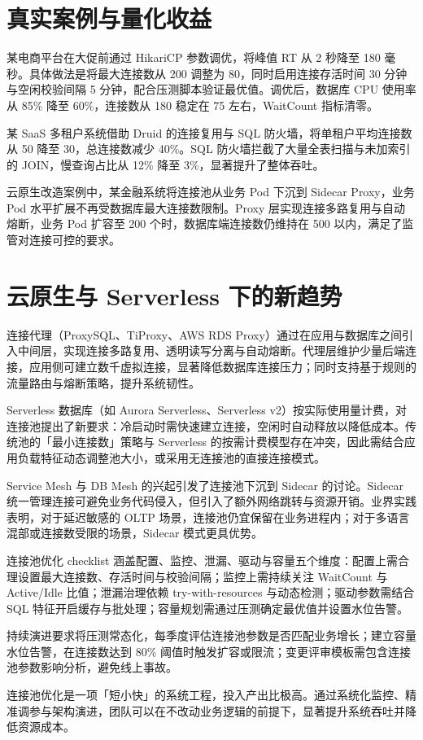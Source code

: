 \chapter{真实案例与量化收益}
某电商平台在大促前通过 HikariCP 参数调优，将峰值 RT 从 2 秒降至 180 毫秒。具体做法是将最大连接数从 200 调整为 80，同时启用连接存活时间 30 分钟与空闲校验间隔 5 分钟，配合压测脚本验证最优值。调优后，数据库 CPU 使用率从 85\%{} 降至 60\%{}，连接数从 180 稳定在 75 左右，WaitCount 指标清零。\par
某 SaaS 多租户系统借助 Druid 的连接复用与 SQL 防火墙，将单租户平均连接数从 50 降至 30，总连接数减少 40\%{}。SQL 防火墙拦截了大量全表扫描与未加索引的 JOIN，慢查询占比从 12\%{} 降至 3\%{}，显著提升了整体吞吐。\par
云原生改造案例中，某金融系统将连接池从业务 Pod 下沉到 Sidecar Proxy，业务 Pod 水平扩展不再受数据库最大连接数限制。Proxy 层实现连接多路复用与自动熔断，业务 Pod 扩容至 200 个时，数据库端连接数仍维持在 500 以内，满足了监管对连接可控的要求。\par
\chapter{云原生与 Serverless 下的新趋势}
连接代理（ProxySQL、TiProxy、AWS RDS Proxy）通过在应用与数据库之间引入中间层，实现连接多路复用、透明读写分离与自动熔断。代理层维护少量后端连接，应用侧可建立数千虚拟连接，显著降低数据库连接压力；同时支持基于规则的流量路由与熔断策略，提升系统韧性。\par
Serverless 数据库（如 Aurora Serverless、Serverless v2）按实际使用量计费，对连接池提出了新要求：冷启动时需快速建立连接，空闲时自动释放以降低成本。传统池的「最小连接数」策略与 Serverless 的按需计费模型存在冲突，因此需结合应用负载特征动态调整池大小，或采用无连接池的直接连接模式。\par
Service Mesh 与 DB Mesh 的兴起引发了连接池下沉到 Sidecar 的讨论。Sidecar 统一管理连接可避免业务代码侵入，但引入了额外网络跳转与资源开销。业界实践表明，对于延迟敏感的 OLTP 场景，连接池仍宜保留在业务进程内；对于多语言混部或连接数受限的场景，Sidecar 模式更具优势。\par
连接池优化 checklist 涵盖配置、监控、泄漏、驱动与容量五个维度：配置上需合理设置最大连接数、存活时间与校验间隔；监控上需持续关注 WaitCount 与 Active/Idle 比值；泄漏治理依赖 try-with-resources 与动态检测；驱动参数需结合 SQL 特征开启缓存与批处理；容量规划需通过压测确定最优值并设置水位告警。\par
持续演进要求将压测常态化，每季度评估连接池参数是否匹配业务增长；建立容量水位告警，在连接数达到 80\%{} 阈值时触发扩容或限流；变更评审模板需包含连接池参数影响分析，避免线上事故。\par
连接池优化是一项「短小快」的系统工程，投入产出比极高。通过系统化监控、精准调参与架构演进，团队可以在不改动业务逻辑的前提下，显著提升系统吞吐并降低资源成本。\par
